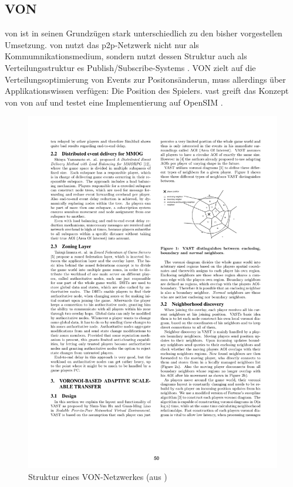 \subsection{VON}
\label{chap:related:von}
\ac{von} ist in seinen Grundzügen stark unterschiedlich zu den bisher vorgestellen Umsetzung. \ac{von} nutzt das \ac{p2p}-Netzwerk nicht nur als Kommumnikationsmedium, sondern nutzt dessen Struktur auch als Verteilungsstruktur es Publish/Subscribe-Systems \cite{Hu2006VON}. VON zielt auf die Verteilungsoptimierung von Events zur Positonsänderun, muss allerdings über Applikationswissen verfügen: Die Position des Spielers. \ac{vast} \cite{Backhaus2007Voronoibased} greift das Konzept von \ac{von} auf und testet eine Implementierung auf OpenSIM \cite{Baumgart2007OverSim}.

\begin{figure}[htbp]
\centering
\includegraphics{grafics/voronoi_von_backhaus.pdf}
\caption{Struktur eines VON-Netzwerkes (aus \cite{Backhaus2007Voronoibased})}
\label{fig:von}
\end{figure}

